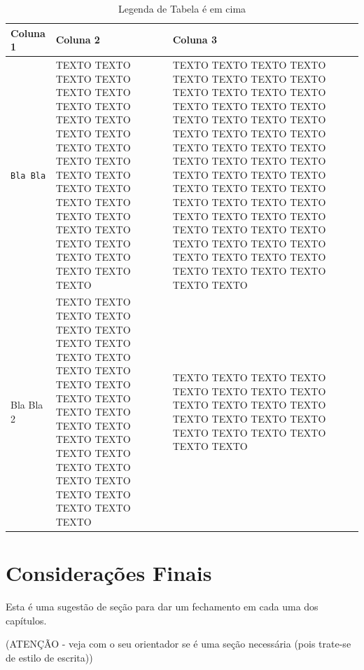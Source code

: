 \begin{table}[h!]
\renewcommand{\arraystretch}{1.3}
\caption{Legenda de Tabela é em cima}
\label{tab:exemplo-001}
\centering
\begin{tabular}{|@{$~$}l@{ }||@{$~$}l@{ }|@{$~$}l@{ }|}
\hline
\textbf{Coluna 1} & \textbf{Coluna 2} & \textbf{Coluna 3} \\
\hline
\begin{minipage}[t]{0.10\textwidth}%
\texttt{Bla Bla} %
\end{minipage} & 
\begin{minipage}[t]{0.30\textwidth}%
  TEXTO TEXTO TEXTO TEXTO TEXTO TEXTO TEXTO TEXTO TEXTO TEXTO TEXTO TEXTO TEXTO TEXTO TEXTO TEXTO TEXTO TEXTO TEXTO TEXTO TEXTO TEXTO TEXTO TEXTO TEXTO TEXTO TEXTO TEXTO TEXTO TEXTO TEXTO TEXTO TEXTO %
\end{minipage} &
\begin{minipage}[t]{0.50\textwidth}%
TEXTO TEXTO TEXTO TEXTO TEXTO TEXTO TEXTO TEXTO TEXTO TEXTO TEXTO TEXTO TEXTO TEXTO TEXTO TEXTO TEXTO TEXTO TEXTO TEXTO TEXTO TEXTO TEXTO TEXTO TEXTO TEXTO TEXTO TEXTO TEXTO TEXTO TEXTO TEXTO TEXTO TEXTO TEXTO TEXTO TEXTO TEXTO TEXTO TEXTO TEXTO TEXTO TEXTO TEXTO TEXTO TEXTO TEXTO TEXTO TEXTO TEXTO TEXTO TEXTO TEXTO TEXTO TEXTO TEXTO TEXTO TEXTO TEXTO TEXTO TEXTO TEXTO TEXTO TEXTO TEXTO TEXTO%
\end{minipage}
\tabularnewline
\hline
\begin{minipage}[t]{0.10\textwidth}%
Bla Bla 2 %
\end{minipage} & 
\begin{minipage}[t]{0.30\textwidth}%
TEXTO TEXTO TEXTO TEXTO TEXTO TEXTO TEXTO TEXTO TEXTO TEXTO TEXTO TEXTO TEXTO TEXTO TEXTO TEXTO TEXTO TEXTO TEXTO TEXTO TEXTO TEXTO TEXTO TEXTO TEXTO TEXTO TEXTO TEXTO TEXTO TEXTO TEXTO TEXTO TEXTO %
\end{minipage} &
\begin{minipage}[t]{0.50\textwidth}%
TEXTO TEXTO TEXTO TEXTO TEXTO TEXTO TEXTO TEXTO TEXTO TEXTO TEXTO TEXTO TEXTO TEXTO TEXTO TEXTO TEXTO TEXTO TEXTO TEXTO TEXTO TEXTO %
\end{minipage}
\tabularnewline
\hline
\end{tabular}
\end{table}

\section{Considerações Finais}
\label{cap:conceitos:sec:consideracoes:finais}

Esta é uma sugestão de seção para dar um fechamento em cada uma dos capítulos.

(ATENÇÃO - veja com o seu orientador se é uma seção necessária (pois trate-se de estilo de escrita))